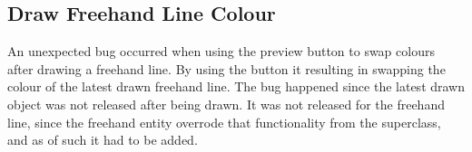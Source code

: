 \subsection{Draw Freehand Line Colour}
An unexpected bug occurred when using the preview button to swap colours after drawing a freehand line. 
By using the button it resulting in swapping the colour of the latest drawn freehand line. 
The bug happened since the latest drawn object was not released after being drawn.
It was not released for the freehand line, since the freehand entity overrode that functionality from the superclass, and as of such it had to be added.

